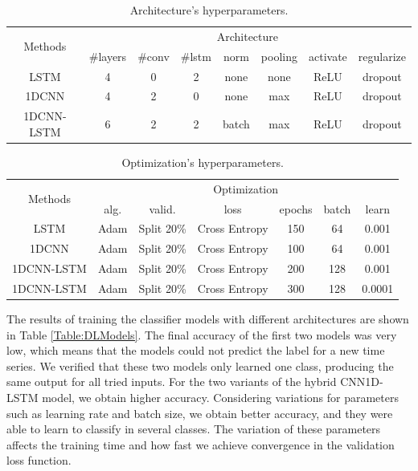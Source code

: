 \begin{table}[h]
	\centering
	\small
	\begin{tabular}{|c|c|c|c|c|c|c|c|}
		\hline
		\multirow{2}{*}{Methods} & \multicolumn{7}{c|}{Architecture} \\
		\cline{2-8}
		& \#layers & \#conv & \#lstm & norm & pooling & activate & regularize \\
		\cline{2-8}
		\hline
		LSTM & 4 & 0 & 2 & none & none & ReLU & dropout \\
		\hline
		1DCNN & 4 & 2 & 0 & none & max & ReLU & dropout \\
		\hline
		1DCNN-LSTM & 6 & 2 & 2 & batch & max & ReLU & dropout  \\
		\hline
	\end{tabular}
	\caption{Architecture’s hyperparameters.}
	\label{Table:HyperparametersNN}
\end{table}

\begin{table}[h]
	\centering
	\small
	\begin{tabular}{|c|c|c|c|c|c|c|}
		\hline
		\multirow{2}{*}{Methods} & \multicolumn{6}{c|}{Optimization} \\
		\cline{2-7}
		& alg. & valid. & loss & epochs & batch & learn \\
		\cline{2-7}
		\hline
		LSTM & Adam & Split 20\% & Cross Entropy & 150 & 64 & 0.001 \\
		\hline
		1DCNN & Adam & Split 20\% & Cross Entropy & 100 & 64 & 0.001 \\
		\hline
		1DCNN-LSTM & Adam & Split 20\% & Cross Entropy & 200 & 128 & 0.001 \\
		\hline
		1DCNN-LSTM & Adam & Split 20\% & Cross Entropy & 300 & 128 & 0.0001 \\
		\hline
	\end{tabular}
	\caption{Optimization’s hyperparameters.}
	\label{Table:OptimizationNN}
\end{table}

The results of training the classifier models with different architectures are shown in Table \ref{Table:DLModels}. The final accuracy of the first two models was very low, which means that the models could not predict the label for a new time series. We verified that these two models only learned one class, producing the same output for all tried inputs. For the two variants of the hybrid CNN1D-LSTM model, we obtain higher accuracy. Considering variations for parameters such as learning rate and batch size, we obtain better accuracy, and they were able to learn to classify in several classes. The variation of these parameters affects the training time and how fast we achieve convergence in the validation loss function. 

